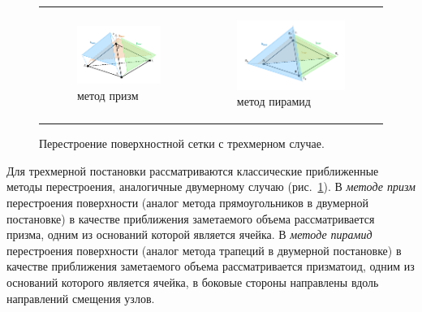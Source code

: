 \documentclass[a4paper,14pt]{extarticle}                     %
\theoremstyle{plain}                                         %
\begin{document}
\begin{figure}[h]
\centering
\begin{tabular}{ll}
\begin{subfigure}{0.4\textwidth}\centering\includegraphics[width=1.0\columnwidth]{pics/text_1_remesh_3d/pic_classical_methods_prisms.pdf}\caption{метод призм}\end{subfigure} &
\begin{subfigure}{0.45\textwidth}\centering\includegraphics[width=1.0\columnwidth]{pics/text_1_remesh_3d/pic_classical_methods_pyramids.pdf}\caption{метод пирамид}\end{subfigure}
\end{tabular}
\singlespacing
\caption{Перестроение поверхностной сетки с трехмерном случае.}
\label{fig:text_1_remesh3}
\end{figure}

Для трехмерной постановки рассматриваются классические приближенные методы перестроения, аналогичные двумерному случаю (рис.~\ref{fig:text_1_remesh3}).
В \textit{методе призм} перестроения поверхности (аналог метода прямоугольников в двумерной постановке) в качестве приближения заметаемого объема рассматривается призма, одним из оснований которой является ячейка.
В \textit{методе пирамид} перестроения поверхности (аналог метода трапеций в двумерной постановке) в качестве приближения заметаемого объема рассматривается призматоид, одним из оснований которого является ячейка, в боковые стороны направлены вдоль направлений смещения узлов.
\end{document}
